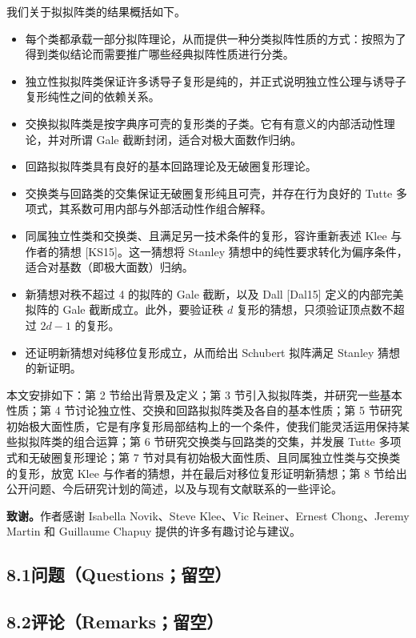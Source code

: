我们关于拟拟阵类的结果概括如下。
\begin{itemize}
\item 每个类都承载一部分拟阵理论，从而提供一种分类拟阵性质的方式：按照为了得到类似结论而需要推广哪些经典拟阵性质进行分类。
\item 独立性拟拟阵类保证许多诱导子复形是纯的，并正式说明独立性公理与诱导子复形纯性之间的依赖关系。
\item 交换拟拟阵类是按字典序可壳的复形类的子类。它有有意义的内部活动性理论，并对所谓 Gale 截断封闭，适合对极大面数作归纳。
\item 回路拟拟阵类具有良好的基本回路理论及无破圈复形理论。
\item 交换类与回路类的交集保证无破圈复形纯且可壳，并存在行为良好的 Tutte 多项式，其系数可用内部与外部活动性作组合解释。
\item 同属独立性类和交换类、且满足另一技术条件的复形，容许重新表述 Klee 与作者的猜想 [KS15]。这一猜想将 Stanley 猜想中的纯性要求转化为偏序条件，适合对基数（即极大面数）归纳。
\item 新猜想对秩不超过 4 的拟阵的 Gale 截断，以及 Dall [Dal15] 定义的内部完美拟阵的 Gale 截断成立。此外，要验证秩 $d$ 复形的猜想，只须验证顶点数不超过 $2d-1$ 的复形。
\item 还证明新猜想对纯移位复形成立，从而给出 Schubert 拟阵满足 Stanley 猜想的新证明。
\end{itemize}

本文安排如下：第 2 节给出背景及定义；第 3 节引入拟拟阵类，并研究一些基本性质；第 4 节讨论独立性、交换和回路拟拟阵类及各自的基本性质；第 5 节研究初始极大面性质，它是有序复形局部结构上的一个条件，使我们能灵活运用保持某些拟拟阵类的组合运算；第 6 节研究交换类与回路类的交集，并发展 Tutte 多项式和无破圈复形理论；第 7 节对具有初始极大面性质、且同属独立性类与交换类的复形，放宽 Klee 与作者的猜想，并在最后对移位复形证明新猜想；第 8 节给出公开问题、今后研究计划的简述，以及与现有文献联系的一些评论。

\textbf{致谢。}作者感谢 Isabella Novik、Steve Klee、Vic Reiner、Ernest Chong、Jeremy Martin 和 Guillaume Chapuy 提供的许多有趣讨论与建议。


\subsection*{8.1\quad 问题（Questions；留空）}\vspace{1cm}
\subsection*{8.2\quad 评论（Remarks；留空）}\vspace{1cm}
\blankrefs


